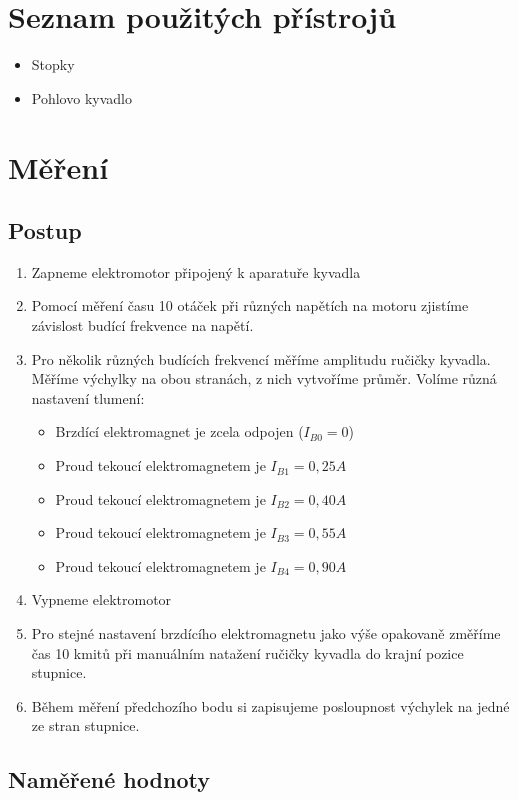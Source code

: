 \documentclass[a4paper,12pt]{article}
\begin{document}
\section{Seznam použitých přístrojů}
\begin{itemize}
    \item Stopky
    \item Pohlovo kyvadlo
\end{itemize}
\section{Měření}
\subsection{Postup}
\begin{enumerate}
    \item Zapneme elektromotor připojený k aparatuře kyvadla
    \item Pomocí měření času 10 otáček při různých napětích na motoru zjistíme závislost budící frekvence na napětí.
    \item Pro několik různých budících frekvencí měříme amplitudu ručičky kyvadla. Měříme výchylky na obou stranách, z nich vytvoříme průměr. Volíme různá nastavení tlumení:
        \begin{itemize}
            \item Brzdící elektromagnet je zcela odpojen ($I_{B0} = 0$)
            \item Proud tekoucí elektromagnetem je $I_{B1}=0,25A$
            \item Proud tekoucí elektromagnetem je $I_{B2}=0,40A$
            \item Proud tekoucí elektromagnetem je $I_{B3}=0,55A$
            \item Proud tekoucí elektromagnetem je $I_{B4}=0,90A$
        \end{itemize}
    \item Vypneme elektromotor
    \item Pro stejné nastavení brzdícího elektromagnetu jako výše opakovaně změříme čas 10 kmitů při manuálním natažení ručičky kyvadla do krajní pozice stupnice.
    \item Během měření předchozího bodu si zapisujeme posloupnost výchylek na jedné ze stran stupnice.
\end{enumerate}

\subsection{Naměřené hodnoty}
\end{document}
